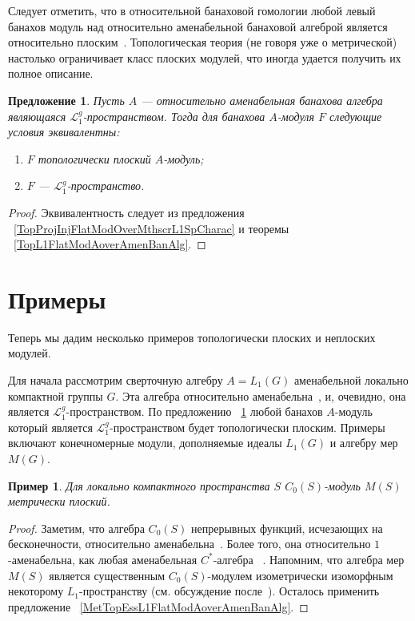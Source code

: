 \documentclass[12pt]{article}
\newtheorem{proposition}[theorem]{Предложение}
\newtheorem{example}[theorem]{Пример}
\begin{document}
Следует отметить, что в относительной банаховой гомологии любой левый банахов
модуль над относительно аменабельной банаховой алгеброй является относительно
плоским~\cite[теорема 7.1.60]{HelBanLocConvAlg}. Топологическая теория  (не
говоря уже о метрической) настолько ограничивает класс плоских модулей, что
иногда удается получить их полное описание.

\begin{proposition}\label{TopFlatModAoverAmenL1BanAlgCharac} Пусть $A$ ---
относительно аменабельная банахова алгебра являющаяся
$\mathcal{L}_1^g$-пространством. Тогда для банахова $A$-модуля $F$ следующие
условия эквивалентны:
\begin{enumerate}[label = (\roman*)]
\item $F$ топологически плоский $A$-модуль;
\item $F$ --- $\mathcal{L}_1^g$-пространство.
\end{enumerate}
\end{proposition}
\begin{proof} Эквивалентность следует из предложения
~\ref{TopProjInjFlatModOverMthscrL1SpCharac} и теоремы
~\ref{TopL1FlatModAoverAmenBanAlg}.
\end{proof}


\section{Примеры}\label{SectionAFewExamples}

Теперь мы дадим несколько примеров топологически плоских и неплоских модулей. 

Для начала рассмотрим сверточную алгебру $A=L_1(G)$ аменабельной локально
компактной группы $G$. Эта алгебра относительно аменабельна~\cite[предложение
VII.1.86]{HelBanLocConvAlg}, и, очевидно, она является
$\mathcal{L}_1^g$-пространством. По предложению
~\ref{TopFlatModAoverAmenL1BanAlgCharac} любой банахов $A$-модуль который
является $\mathcal{L}_1^g$-пространством будет топологически плоским. Примеры
включают конечномерные модули, дополняемые идеалы $L_1(G)$ и алгебру мер $M(G)$.

\begin{example} Для локально компактного пространства $S$ $C_0(S)$-модуль $M(S)$
метрически плоский.
\end{example}
\begin{proof}
Заметим, что алгебра $C_0(S)$ непрерывных функций, исчезающих на бесконечности,
относительно аменабельна~\cite[теорема 7.1.87]{HelBanLocConvAlg}. Более того,
она относительно $1$-аменабельна, как любая аменабельная $C^*$-алгебра
~\cite[пример 2]{RundeAmenConstFour}. Напомним, что алгебра мер $M(S)$ является
существенным $C_0(S)$-модулем изометрически изоморфным некоторому
$L_1$-пространству (см. обсуждение после~\cite[предложение
2.14]{DalLauSecondDualOfMeasAlg}). Осталось применить предложение
~\ref{MetTopEssL1FlatModAoverAmenBanAlg}.
\end{proof}
\end{document}
